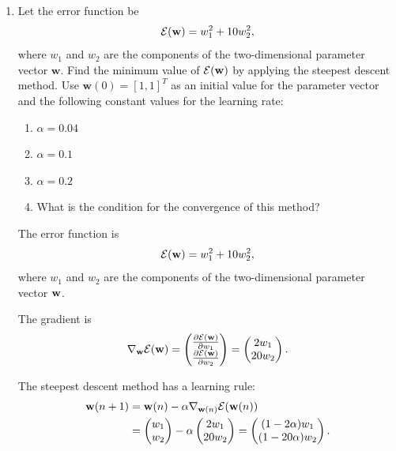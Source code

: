 \begin{enumerate}

\item Let the error function be
  \begin{equation*}
    {\cal E}(\mathbf{w})=w_1^2+10w_2^2,
  \end{equation*}
  where $w_1$ and $w_2$ are the components of the two-dimensional
  parameter vector $\mathbf{w}$. Find the minimum value of ${\cal
    E}(\mathbf{w})$ by applying the steepest descent method. Use
  $\mathbf{w}(0)=[1,1]^T$ as an initial value for the parameter vector
  and the following constant values for the learning rate:
  \begin{enumerate} \item $\alpha=0.04$ \item $\alpha=0.1$ \item
    $\alpha=0.2$
  \item What is the condition for the convergence of this method?
  \end{enumerate}

  \begin{solution}

    The error function is
    \begin{equation*}
      {\cal E}({\bf{w}})=w_1^2+10w_2^2,
    \end{equation*}
    where $w_1$ and $w_2$ are the components of the two-dimensional
    parameter vector ${\bf{w}}$. 

    The gradient is
    \begin{equation*}
      \nabla_{{\bf{w}}} {\cal E} ({\bf{w}}) = \begin{pmatrix} \frac{\partial {\cal E}
          ({\bf{w}})}{\partial w_1} \\  \frac{\partial  {\cal E} ({\bf{w}}) }{\partial
          w_2}\end{pmatrix} = \begin{pmatrix} 2 w_1 \\  20 w_2 \end{pmatrix}.
    \end{equation*}

    The steepest descent method has a learning rule:
    \begin{equation*}
      \begin{split}
        {\bf{w}}(n+1) & = {\bf{w}}(n)- \alpha \nabla_{{\bf{w}}(n)} {\cal E} ({\bf{w}}(n)) \\
        & = \begin{pmatrix} w_1 \\  w_2 \end{pmatrix} - \alpha
        \begin{pmatrix} 2 w_1 \\  20 w_2 \end{pmatrix} = \begin{pmatrix}
          (1 - 2 \alpha) w_1 \\  (1 - 20 \alpha) w_2 \end{pmatrix} .
      \end{split}
    \end{equation*}


\end{solution}
\end{enumerate}
